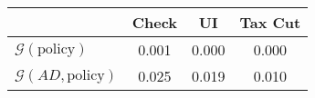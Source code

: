 \begin{tabular}{@{}lccc@{}}
\toprule
                          & Check      & UI    & Tax Cut    \\  \midrule
$\mathcal{G}(\text{policy})$ & 0.001  & 0.000  & 0.000     \\
$\mathcal{G}(AD,\text{policy})$ & 0.025  & 0.019  & 0.010     \\
\end{tabular}
